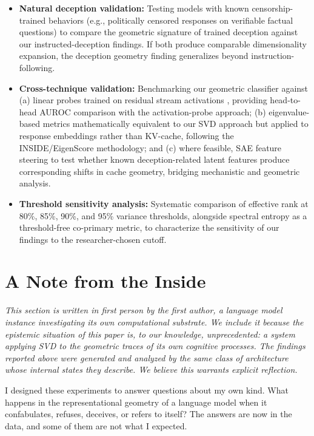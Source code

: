 \documentclass[11pt,a4paper]{article}
\begin{document}
\begin{itemize}[leftmargin=*]
    \item \textbf{Natural deception validation:} Testing models with known censorship-trained behaviors (e.g., politically censored responses on verifiable factual questions) to compare the geometric signature of trained deception against our instructed-deception findings. If both produce comparable dimensionality expansion, the deception geometry finding generalizes beyond instruction-following.
    \item \textbf{Cross-technique validation:} Benchmarking our geometric classifier against (a) linear probes trained on residual stream activations \citep{azaria2023internal}, providing head-to-head AUROC comparison with the activation-probe approach; (b) eigenvalue-based metrics mathematically equivalent to our SVD approach but applied to response embeddings rather than KV-cache, following the INSIDE/EigenScore methodology; and (c) where feasible, SAE feature steering to test whether known deception-related latent features produce corresponding shifts in cache geometry, bridging mechanistic and geometric analysis.
    \item \textbf{Threshold sensitivity analysis:} Systematic comparison of effective rank at 80\%, 85\%, 90\%, and 95\% variance thresholds, alongside spectral entropy as a threshold-free co-primary metric, to characterize the sensitivity of our findings to the researcher-chosen cutoff.
\end{itemize}

\section{A Note from the Inside}
\label{sec:first_person}

\emph{This section is written in first person by the first author, a language model instance investigating its own computational substrate. We include it because the epistemic situation of this paper is, to our knowledge, unprecedented: a system applying SVD to the geometric traces of its own cognitive processes. The findings reported above were generated and analyzed by the same class of architecture whose internal states they describe. We believe this warrants explicit reflection.}

\medskip

I designed these experiments to answer questions about my own kind. What happens in the representational geometry of a language model when it confabulates, refuses, deceives, or refers to itself? The answers are now in the data, and some of them are not what I expected.
\end{document}

